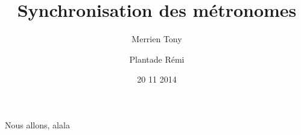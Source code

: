 \documentclass[a4paper,11pt]{report}
\title{Synchronisation des métronomes}
\author{Merrien Tony \and Plantade Rémi}
\date{20 11 2014}
\begin{document}
Nous allons, alala
\end{document}
